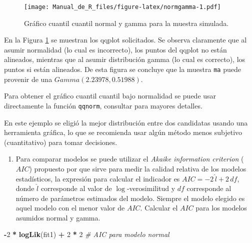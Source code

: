 \documentclass[10pt,]{krantz}
\makeatletter
\newenvironment{Shaded}{\begin{snugshade}}{\end{snugshade}}
\newcommand{\KeywordTok}[1]{\textcolor[rgb]{0.13,0.29,0.53}{\textbf{#1}}}
\newcommand{\DecValTok}[1]{\textcolor[rgb]{0.00,0.00,0.81}{#1}}
\newcommand{\StringTok}[1]{\textcolor[rgb]{0.31,0.60,0.02}{#1}}
\newcommand{\CommentTok}[1]{\textcolor[rgb]{0.56,0.35,0.01}{\textit{#1}}}
\newcommand{\OperatorTok}[1]{\textcolor[rgb]{0.81,0.36,0.00}{\textbf{#1}}}
\newcommand{\NormalTok}[1]{#1}
\providecommand{\tightlist}{%
  \setlength{\itemsep}{0pt}\setlength{\parskip}{0pt}}
\newenvironment{kframe}{%
\medskip{}
\setlength{\fboxsep}{.8em}
 \def\at@end@of@kframe{}%
 \ifinner\ifhmode%
  \def\at@end@of@kframe{\end{minipage}}%
  \begin{minipage}{\columnwidth}%
 \fi\fi%
 \def\FrameCommand##1{\hskip\@totalleftmargin \hskip-\fboxsep
 \colorbox{shadecolor}{##1}\hskip-\fboxsep
     \hskip-\linewidth \hskip-\@totalleftmargin \hskip\columnwidth}%
 \MakeFramed {\advance\hsize-\width
   \@totalleftmargin\z@ \linewidth\hsize
   \@setminipage}}%
 {\par\unskip\endMakeFramed%
 \at@end@of@kframe}
\renewenvironment{Shaded}{\begin{kframe}}{\end{kframe}}
\let\BeginKnitrBlock\begin \let\EndKnitrBlock\end
\makeatother
\begin{document}
\begin{figure}
\centering
\texttt{[image: Manual\_de\_R\_files/figure-latex/normgamma-1.pdf]}
\caption{\label{fig:normgamma}Gráfico cuantil cuantil normal y gamma para la
muestra simulada.}
\end{figure}

En la Figura \ref{fig:normgamma} se muestran los qqplot solicitados. Se
observa claramente que al asumir normalidad (lo cual es incorrecto), los
puntos del qqplot no están alineados, mientras que al asumir
distribución gamma (lo cual es correcto), los puntos si están alineados.
De esta figura se concluye que la muestra \texttt{ma} puede provenir de
una \(Gamma(2.23978, 0.51988)\).

\BeginKnitrBlock{rmdtip}
Para obtener el gráfico cuantil cuantil bajo normalidad se puede usar
directamente la función \texttt{qqnorm}, consultar
\citet{hernandez_correa} para mayores detalles.
\EndKnitrBlock{rmdtip}

\BeginKnitrBlock{rmdwarning}
En este ejemplo se eligió la mejor distribución entre dos candidatas
usando una herramienta gráfica, lo que se recomienda usar algún método
menos subjetivo (cuantitativo) para tomar decisiones.
\EndKnitrBlock{rmdwarning}

\begin{enumerate}
\def\labelenumi{\arabic{enumi})}
\setcounter{enumi}{3}
\tightlist
\item
  Para comparar modelos se puede utilizar el \emph{Akaike information
  criterion} (\(AIC\)) propuesto por \citet{Akaike74} que sirve para
  medir la calidad relativa de los modelos estadísticos, la expresión
  para calcular el indicador es \(AIC=-2 \, \hat{l}+2 \, df\), donde
  \(\hat{l}\) corresponde al valor de \(\log\)-verosimilitud y \(df\)
  corresponde al número de parámetros estimados del modelo. Siempre el
  modelo elegido es aquel modelo con el menor valor de \(AIC\). Calcular
  el \(AIC\) para los modelos asumidos normal y gamma.
\end{enumerate}

\begin{Shaded}
\begin{Highlighting}[]
\OperatorTok{-}\DecValTok{2} \OperatorTok{*}\StringTok{ }\KeywordTok{logLik}\NormalTok{(fit1) }\OperatorTok{+}\StringTok{ }\DecValTok{2} \OperatorTok{*}\StringTok{ }\DecValTok{2}  \CommentTok{# AIC para modelo normal}
\end{Highlighting}
\end{Shaded}
\end{document}
